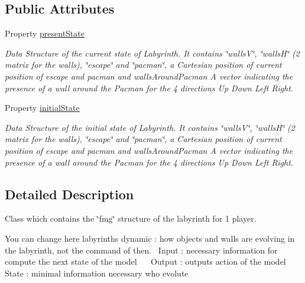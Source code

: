 \subsection*{Public Attributes}
\begin{DoxyCompactItemize}
\item 
Property \hyperlink{class_model_laby_a9624cc7c421a50fa5086b0ebd0cd5fe3}{present\+State}
\begin{DoxyCompactList}\small\item\em Data Structure of the current state of Labyrinth. It contains \char`\"{}walls\+V\char`\"{}, \char`\"{}walls\+H\char`\"{} (2 matrix for the walls), \char`\"{}escape\char`\"{} and \char`\"{}pacman\char`\"{}, a Cartesian position of current position of escape and pacman and \textquotesingle{}walls\+Around\+Pacman\textquotesingle{} A vector indicating the presence of a wall around the Pacman for the 4 directions Up Down Left Right. \end{DoxyCompactList}\item 
Property \hyperlink{class_model_laby_acd9263acfa96c9138afdf497e55acc24}{initial\+State}
\begin{DoxyCompactList}\small\item\em Data Structure of the initial state of Labyrinth. It contains \char`\"{}walls\+V\char`\"{}, \char`\"{}walls\+H\char`\"{} (2 matrix for the walls), \char`\"{}escape\char`\"{} and \char`\"{}pacman\char`\"{}, a Cartesian position of current position of escape and pacman and \textquotesingle{}walls\+Around\+Pacman\textquotesingle{} A vector indicating the presence of a wall around the Pacman for the 4 directions Up Down Left Right. \end{DoxyCompactList}\end{DoxyCompactItemize}


\subsection{Detailed Description}
Class which contains the \char`\"{}fmg\char`\"{} structure of the labyrinth for 1 player. 

You can change here labyrinth\textquotesingle{}s dynamic \+: how objects and walls are evolving in the labyrinth, not the command of then.~\newline
 Input \+: necessary information for compute the next state of the model~\newline
~\newline
 Output \+: output\textquotesingle{}s action of the model~\newline
 ~\newline
 State \+: minimal information necessary who evolute 


